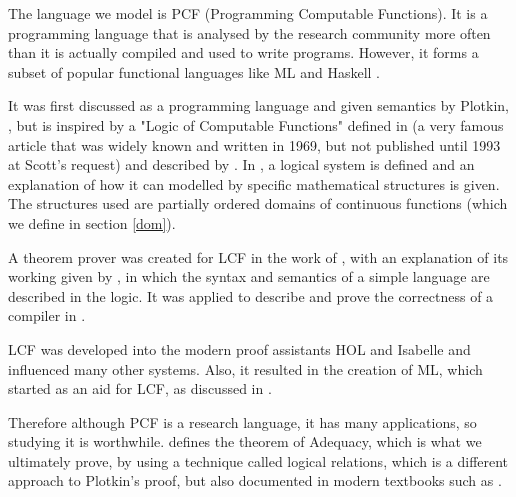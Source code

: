 The language we model is PCF (Programming Computable Functions). It is a programming language that is analysed by the research community more often than it is actually compiled and used to write programs. However, it forms a subset of popular functional languages like ML \citep{Milner97} and Haskell \citep{Marlow10}.

It was first discussed as a programming language and given semantics by Plotkin, \citep{Plotkin77}, but is inspired by a "Logic of Computable Functions" defined in \citep{Scott93} (a very famous article that was widely known and written in 1969, but not published until 1993 at Scott's request) and described by \citep{Milner73}. In \citep{Scott93}, a logical system is defined and an explanation of how it can modelled by specific mathematical structures is given. The structures used are partially ordered domains of continuous functions (which we define in section \ref{dom}).

A theorem prover was created for LCF in the work of \citep{Milner72a}, with an explanation of its working given by \citep{Milner72b}, in which the syntax and semantics of a simple language are described in the logic. It was applied to  describe and prove the correctness of a compiler in \citep{Milner72c}.

LCF was developed into the modern proof assistants HOL and Isabelle \citep{Nipkow02} and influenced many other systems. Also, it resulted in the creation of ML, which started as an aid for LCF, as discussed in \citep{Gordon00}.

Therefore although PCF is a research language, it has many applications, so studying it is worthwhile. \citep{Plotkin77} defines the theorem of Adequacy, which is what we ultimately prove, by using a technique called logical relations, which is a different approach to Plotkin's proof, but also documented in modern textbooks such as \citep{Streicher06}. 

%

